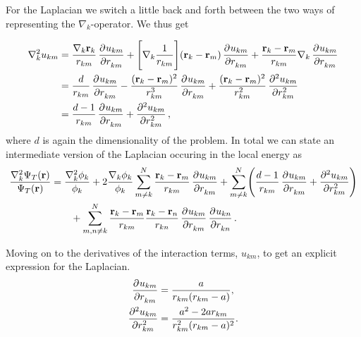 \documentclass[
    a4paper, aps, twocolumn, floatfix, superscriptaddress]{revtex4-1}
\newcommand{\vf}{\mathbf}
\newcommand{\1}{\mathds{1}}
\begin{document}
            For the Laplacian we switch a little back and forth between the two
            ways of representing the $\nabla_k$-operator. We thus get
            \begin{widetext}
                \begin{align}
                    \nabla_k^2 u_{km}
                    &=
                    \frac{\nabla_k \vf{r}_k}{r_{km}}\dpd[]{u_{km}}{r_{km}}
                    + \Biggl[
                        \nabla_k \frac{1}{r_{km}}
                    \Biggr]
                    (\vf{r}_k - \vf{r}_m)\dpd[]{u_{km}}{r_{km}}
                    + \frac{\vf{r}_k - \vf{r}_m}{r_{km}}
                    \nabla_k \dpd[]{u_{km}}{r_{km}} \\
                    &= \frac{d}{r_{km}}\dpd[]{u_{km}}{r_{km}}
                    - \frac{(\vf{r}_k - \vf{r}_m)^2}{r_{km}^3}
                    \dpd[]{u_{km}}{r_{km}}
                    + \frac{(\vf{r}_k - \vf{r}_m)^2}{r_{km}^2}
                    \dpd[2]{u_{km}}{r_{km}} \\
                    &=
                    \frac{d - 1}{r_{km}}\dpd[]{u_{km}}{r_{km}}
                    + \dpd[2]{u_{km}}{r_{km}},
                \end{align}
                where $d$ is again the dimensionality of the problem. In total
                we can state an intermediate version of the Laplacian occuring
                in the local energy as
                \begin{align}
                    \frac{\nabla_k^2\Psi_T(\vf{r})}{\Psi_T(\vf{r})}
                    &=
                    \frac{\nabla_k^2\phi_k}{\phi_k}
                    + 2\frac{\nabla_k\phi_k}{\phi_k}
                    \sum_{m \neq k}^N
                    \frac{\vf{r}_k - \vf{r}_m}{r_{km}}
                    \dpd[]{u_{km}}{r_{km}}
                    + \sum_{m\neq k}^N
                    \Biggl(
                        \frac{d - 1}{r_{km}}\dpd[]{u_{km}}{r_{km}}
                        + \dpd[2]{u_{km}}{r_{km}}
                    \Biggr)
                    \nonumber \\
                    &\qquad
                    +
                    \sum_{m, n \neq k}^N
                    \frac{\vf{r}_k - \vf{r}_m}{r_{km}}
                    \frac{\vf{r}_k - \vf{r}_n}{r_{kn}}
                    \dpd[]{u_{km}}{r_{km}}
                    \dpd[]{u_{kn}}{r_{kn}}.
                \end{align}
            \end{widetext}
            Moving on to the derivatives of the interaction terms, $u_{km}$, to
            get an explicit expression for the Laplacian.
            \begin{align}
                \dpd[]{u_{km}}{r_{km}}
                &=
                \frac{a}{r_{km}(r_{km} - a)},
                \\
                \dpd[2]{u_{km}}{r_{km}}
                &= \frac{a^2 - 2ar_{km}}{r_{km}^2(r_{km} - a)^2}.
            \end{align}
\end{document}
